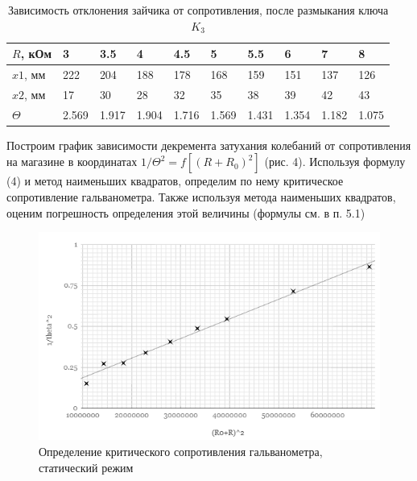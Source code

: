 \documentclass[a4paper]{article}
\begin{document}
\begin{enumerate}
    \begin{table}[h]
    \centering
    \begin{center}
    \caption{Зависимость отклонения зайчика от сопротивления, после размыкания ключа $K_3$}
    \end{center}
    \vspace{0.1cm}
    \label{tab:my_label}
    \begin{tabular}{ |p{1.5cm}||p{1cm}|p{1cm}|p{1cm}|p{1cm}|p{1cm}|p{1cm}|p{1cm}|p{1cm}|p{1cm}| }
\hline
    $R$, кОм & 3 & 3.5 & 4 & 4.5 & 5 & 5.5 & 6 & 7 & 8  \\
\hline
    $x1$, мм & 222 & 204 & 188 & 178 & 168 & 159 & 151 & 137 & 126 \\
\hline
    $x2$, мм & 17 & 30 & 28 & 32 & 35 & 38 & 39 & 42 & 43 \\
\hline
    $\Theta$ & 2.569 & 1.917 & 1.904 & 1.716 & 1.569 & 1.431 & 1.354 & 1.182 & 1.075 \\
\hline

    \end{tabular}
\end{table}   

Построим график зависимости декремента затухания колебаний от сопротивления на магазине в координатах $1/\Theta^2 = f[(R+R_0)^2]$ (рис. 4). Используя формулу (4) и метод наименьших квадратов, определим по нему критическое сопротивление гальванометра. Также используя метода наименьших квадратов, оценим погрешность определения этой величины (формулы см. в п. 5.1)

\begin{figure}[h]
    \centering
    \includegraphics[width=\textwidth]{graph2.PNG}
    \caption{Определение критического сопротивления гальванометра, статический режим}
    \label{fig:vac}
\end{figure}


\end{enumerate}
\end{document}
